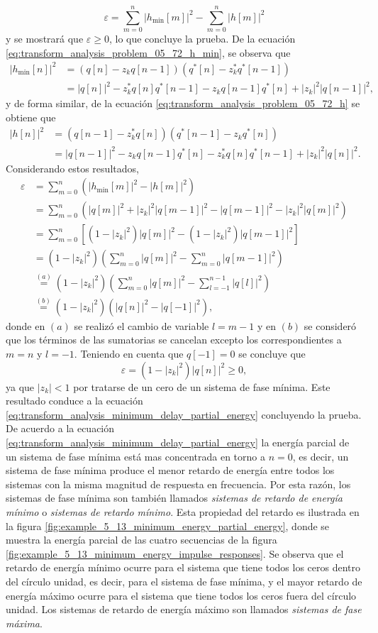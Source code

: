 \documentclass[a4paper]{report}
\begin{document}
\[
 \varepsilon=\sum_{m=0}^n|h_\textrm{min}[m]|^2-\sum_{m=0}^n|h[m]|^2
\]
y se mostrará que \(\varepsilon\geq0\), lo que concluye la prueba. De la ecuación \ref{eq:transform_analysis_problem_05_72_h_min}, se observa que 
\begin{align*}
 |h_\textrm{min}[n]|^2&=(q[n]-z_kq[n-1])(q^*[n]-z_k^*q^*[n-1])\\
  &=|q[n]|^2-z_k^*q[n]q^*[n-1]-z_kq[n-1]q^*[n]+|z_k|^2|q[n-1]|^2,
\end{align*}
y de forma similar, de la ecuación \ref{eq:transform_analysis_problem_05_72_h} se obtiene que 
\begin{align*}
 |h[n]|^2&=(q[n-1]-z_k^*q[n])(q^*[n-1]-z_kq^*[n])\\
  &=|q[n-1]|^2-z_kq[n-1]q^*[n]-z_k^*q[n]q^*[n-1]+|z_k|^2|q[n]|^2.
\end{align*}
Considerando estos resultados,
\begin{align*}
 \varepsilon&=\sum_{m=0}^n\left(|h_\textrm{min}[m]|^2-|h[m]|^2\right)\\
  &=\sum_{m=0}^n\left(|q[m]|^2+|z_k|^2|q[m-1]|^2-|q[m-1]|^2-|z_k|^2|q[m]|^2\right)\\
  &=\sum_{m=0}^n\left[(1-|z_k|^2)|q[m]|^2-(1-|z_k|^2)|q[m-1]|^2\right]\\ 
  &=(1-|z_k|^2)\left(\sum_{m=0}^n|q[m]|^2-\sum_{m=0}^n|q[m-1]|^2\right)\\
  &\overset{(a)}{=}(1-|z_k|^2)\left(\sum_{m=0}^n|q[m]|^2-\sum_{l=-1}^{n-1}|q[l]|^2\right)\\
  &\overset{(b)}{=}(1-|z_k|^2)(|q[n]|^2-|q[-1]|^2),
\end{align*}
donde en \((a)\) se realizó el cambio de variable \(l=m-1\) y en \((b)\) se consideró que los términos de las sumatorias se cancelan excepto los correspondientes a \(m=n\) y \(l=-1\). Teniendo en cuenta que \(q[-1]=0\) se concluye que 
\[
 \varepsilon=(1-|z_k|^2)|q[n]|^2\geq0,
\]
ya que \(|z_k|<1\) por tratarse de un cero de un sistema de fase mínima. Este resultado conduce a la ecuación \ref{eq:transform_analysis_minimum_delay_partial_energy} concluyendo la prueba. De acuerdo a la ecuación \ref{eq:transform_analysis_minimum_delay_partial_energy} la energía parcial de un sistema de fase mínima está mas concentrada en torno a \(n=0\), es decir, un sistema de fase mínima produce el menor retardo de energía entre todos los sistemas con la misma magnitud de respuesta en frecuencia. Por esta razón, los sistemas de fase mínima son también llamados \emph{sistemas de retardo de energía mínimo} o \emph{sistemas de retardo mínimo}. Esta propiedad del retardo es ilustrada en la figura \ref{fig:example_5_13_minimum_energy_partial_energy}, donde se muestra la energía parcial de las cuatro secuencias de la figura \ref{fig:example_5_13_minimum_energy_impulse_responses}. Se observa que el retardo de energía mínimo ocurre para el sistema que tiene todos los ceros dentro del círculo unidad, es decir, para el sistema de fase mínima, y el mayor retardo de energía máximo ocurre para el sistema que tiene todos los ceros fuera del círculo unidad. Los sistemas de retardo de energía máximo son llamados \emph{sistemas de fase máxima}.
\end{document}
